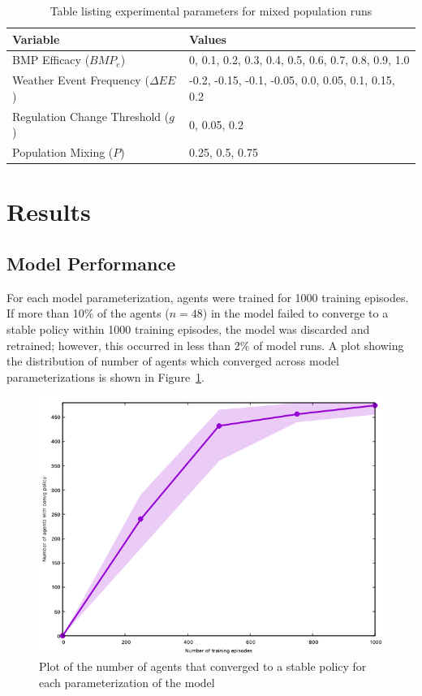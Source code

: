 \begin{table}
\centering
\caption{Table listing experimental parameters for mixed population runs}
\label{tab:farm_exp_mix}
\begin{tabular}{ll}
\hline
Variable & Values \\
\hline
BMP Efficacy ($BMP_e$) & 0, 0.1, 0.2, 0.3, 0.4, 0.5, 0.6, 0.7, 0.8, 0.9, 1.0 \\
Weather Event Frequency ($\Delta EE$)
    & -0.2, -0.15, -0.1, -0.05, 0.0, 0.05, 0.1, 0.15, 0.2 \\
Regulation Change Threshold ($g$)
    & 0, 0.05, 0.2 \\
Population Mixing ($P$) & 0.25, 0.5, 0.75 \\
\hline
\end{tabular}
\end{table}

\section{Results}
\label{sec:farm_results}

\subsection{Model Performance}
\label{subsec:farm_results_robust}

For each model parameterization,
agents were trained for 1000 training episodes.
If more than 10\%  of the agents ($n=48$) in the model failed to converge
to a stable policy within 1000 training episodes, the model was discarded 
and retrained; however, this occurred in less than 2\% of model runs.
A plot showing the distribution of number of agents which converged
across model parameterizations is shown in Figure~\ref{fig:farm_sfc}.

\begin{figure}
\centering
\includegraphics[width=.4\textwidth]{figure/sfc}
\caption{Plot of the number of agents that converged to a stable policy
    for each parameterization of the model}
\label{fig:farm_sfc}
\end{figure}

